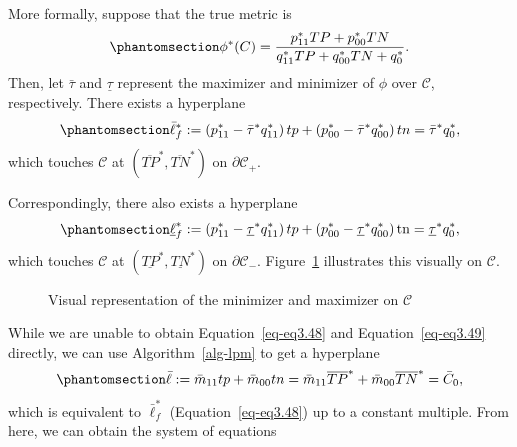 \documentclass[
  letterpaper,
  numbers=noenddot,
  DIV=11]{scrreprt}
\theoremstyle{plain}
\theoremstyle{definition}
\theoremstyle{plain}
\theoremstyle{remark}
\begin{document}
More formally, suppose that the true metric is
\begin{equation}\phantomsection\label{eq-eq3.48}{\phi^{*}(C)=\frac{p_{11}^{*} T P+p_{00}^{*} T N}{q_{11}^{*} T P+q_{00}^{*} T N+q_{0}^{*}}.}\end{equation}
Then, let \(\bar{\tau}\) and \(\underline{\tau}\) represent the
maximizer and minimizer of \(\phi\) over \(\mathcal{C}\), respectively.
There exists a hyperplane
\begin{equation}\phantomsection\label{eq-eq3.49}{\begin{aligned}
\bar{\ell}_{f}^{*}:=\left(p_{11}^{*}-\bar{\tau}^{*} q_{11}^{*}\right) t p+\left(p_{00}^{*}-\bar{\tau}^{*} q_{00}^{*}\right) t n=\bar{\tau}^{*} q_{0}^{*},
\end{aligned}}\end{equation} which touches \(\mathcal{C}\) at
\(\left(\overline{T P}^{*}, \overline{T N}^{*}\right)\) on
\(\partial \mathcal{C}_{+}\).

Correspondingly, there also exists a hyperplane
\begin{equation}\phantomsection\label{eq-eq3.50}{\begin{aligned}
\underline{\ell}_{f}^{*}:=\left(p_{11}^{*}-\underline{\tau}^{*} q_{11}^{*}\right) t p+\left(p_{00}^{*}-\underline{\tau}^{*} q_{00}^{*}\right) \operatorname{tn}=\underline{\tau}^{*} q_{0}^{*},
\end{aligned}}\end{equation} which touches \(\mathcal{C}\) at
\(\left(\underline{TP}^{*}, \underline{T N}^{*}\right)\) on
\(\partial \mathcal{C}_{-}\). Figure~\ref{fig-minmax} illustrates this
visually on \(\mathcal{C}\).

\begin{figure}


\caption{\label{fig-minmax}Visual representation of the minimizer and
maximizer on \(\mathcal{C}\)}

\end{figure}%

While we are unable to obtain Equation~\ref{eq-eq3.48} and
Equation~\ref{eq-eq3.49} directly, we can use  Algorithm~\ref{alg-lpm} 
to get a hyperplane
\begin{equation}\phantomsection\label{eq-eq3.51}{\bar{\ell}:=\bar{m}_{11} t p+\bar{m}_{00} t n= \bar{m}_{11} \overline{T P}^{*}+\bar{m}_{00} \overline{T N}^{*} = \bar{C}_{0},}\end{equation}
which is equivalent to \(\bar{\ell}_{f}^{*}\) (Equation~\ref{eq-eq3.48})
up to a constant multiple. From here, we can obtain the system of
equations
\end{document}
